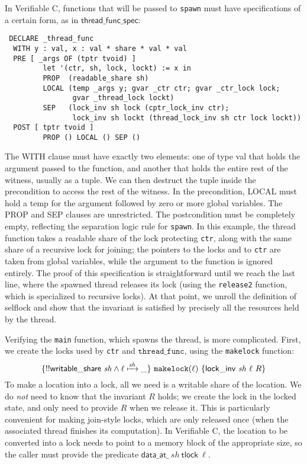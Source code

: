 \documentclass[11pt]{article} %
\begin{document}
In Verifiable C, functions that will be passed to \texttt{spawn} must have specifications of a certain form, as in $\mathsf{thread\_func\_spec}$:
\begin{verbatim}
 DECLARE _thread_func
  WITH y : val, x : val * share * val * val
  PRE [ _args OF (tptr tvoid) ]
         let '(ctr, sh, lock, lockt) := x in
         PROP  (readable_share sh)
         LOCAL (temp _args y; gvar _ctr ctr; gvar _ctr_lock lock;
                gvar _thread_lock lockt)
         SEP   (lock_inv sh lock (cptr_lock_inv ctr);
                lock_inv sh lockt (thread_lock_inv sh ctr lock lockt))
  POST [ tptr tvoid ]
         PROP () LOCAL () SEP ()
\end{verbatim}
The \textsf{WITH} clause must have exactly two elements: one of type \textsf{val} that holds the argument passed to the function, and another that holds the entire rest of the witness, usually as a tuple. We can then destruct the tuple inside the precondition to access the rest of the witness. In the precondition, \textsf{LOCAL} must hold a \textsf{temp} for the argument followed by zero or more global variables. The \textsf{PROP} and \textsf{SEP} clauses are unrestricted. The postcondition must be completely empty, reflecting the separation logic rule for \texttt{spawn}. In this example, the thread function takes a readable share of the lock protecting \texttt{ctr}, along with the same share of a recursive lock for joining; the pointers to the locks and to \texttt{ctr} are taken from global variables, while the argument to the function is ignored entirely. The proof of this specification is straightforward until we reach the last line, where the spawned thread releases its lock (using the \texttt{release2} function, which is specialized to recursive locks). At that point, we unroll the definition of \textsf{selflock} and show that the invariant is satisfied by precisely all the resources held by the thread.

Verifying the \texttt{main} function, which spawns the thread, is more complicated. First, we create the locks used by \texttt{ctr} and $\mathtt{thread\_func}$, using the \texttt{makelock} function:
$$\{!!\mathsf{writable\_share}\ \mathit{sh} \land \ell \xmapsto{\mathit{sh}} \_\}\ \texttt{makelock}(\ell)\ \{\mathsf{lock\_inv}\ \mathit{sh}\ \ell\ R\}$$
To make a location into a lock, all we need is a writable share of the location. We do \emph{not} need to know that the invariant $R$ holds; we create the lock in the locked state, and only need to provide $R$ when we release it. This is particularly convenient for making join-style locks, which are only released once (when the associated thread finishes its computation). In Verifiable C, the location to be converted into a lock needs to point to a memory block of the appropriate size, so the caller must provide the predicate $\mathsf{data\_at\_}\ \mathit{sh}\ \mathsf{tlock}\ \ell$.
\end{document}
